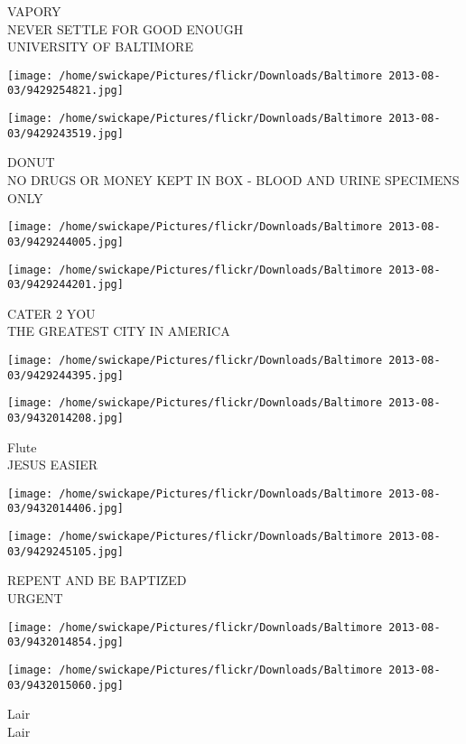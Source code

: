 \documentclass[10pt,letterpaper]{article}
\begin{document}
VAPORY\\
NEVER SETTLE FOR GOOD ENOUGH\\
UNIVERSITY OF BALTIMORE
\pagebreak

\texttt{[image: /home/swickape/Pictures/flickr/Downloads/Baltimore 2013-08-03/9429254821.jpg]}

\vspace{0.25in}
\texttt{[image: /home/swickape/Pictures/flickr/Downloads/Baltimore 2013-08-03/9429243519.jpg]}

DONUT\\
NO DRUGS OR MONEY KEPT IN BOX {-} BLOOD AND URINE SPECIMENS ONLY
\pagebreak

\texttt{[image: /home/swickape/Pictures/flickr/Downloads/Baltimore 2013-08-03/9429244005.jpg]}

\vspace{0.25in}
\texttt{[image: /home/swickape/Pictures/flickr/Downloads/Baltimore 2013-08-03/9429244201.jpg]}

CATER 2 YOU\\
THE GREATEST CITY IN AMERICA
\pagebreak

\texttt{[image: /home/swickape/Pictures/flickr/Downloads/Baltimore 2013-08-03/9429244395.jpg]}

\vspace{0.25in}
\texttt{[image: /home/swickape/Pictures/flickr/Downloads/Baltimore 2013-08-03/9432014208.jpg]}

Flute\\
JESUS EASIER
\pagebreak

\texttt{[image: /home/swickape/Pictures/flickr/Downloads/Baltimore 2013-08-03/9432014406.jpg]}

\vspace{0.25in}
\texttt{[image: /home/swickape/Pictures/flickr/Downloads/Baltimore 2013-08-03/9429245105.jpg]}

REPENT AND BE BAPTIZED\\
URGENT
\pagebreak

\texttt{[image: /home/swickape/Pictures/flickr/Downloads/Baltimore 2013-08-03/9432014854.jpg]}

\vspace{0.25in}
\texttt{[image: /home/swickape/Pictures/flickr/Downloads/Baltimore 2013-08-03/9432015060.jpg]}

Lair\\
Lair
\pagebreak
\end{document}
